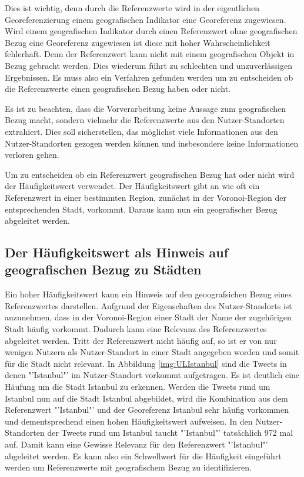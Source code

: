 		Dies ist wichtig, denn durch die Referenzwerte wird in der eigentlichen Georeferenzierung einem geografischen Indikator eine Georeferenz zugewiesen. 
		Wird einem geografischen Indikator durch einen Referenzwert ohne geografischen Bezug eine Georeferenz zugewiesen ist diese mit hoher Wahrscheinlichkeit fehlerhaft.
		Denn der Referenzwert kann nicht mit einem geografischen Objekt in Bezug gebracht werden.
		Dies wiederum führt zu schlechten und unzuverlässigen Ergebnissen.
		Es muss also ein Verfahren gefunden werden um zu entscheiden ob die Referenzwerte einen geografischen Bezug haben oder nicht.

		Es ist zu beachten, dass die Vorverarbeitung keine Aussage zum geografischen Bezug macht, sondern vielmehr die Referenzwerte aus den Nutzer-Standorten extrahiert. 
		Dies soll sicherstellen, das möglichst viele Informationen aus den Nutzer-Standorten gezogen werden können und insbesondere keine Informationen verloren gehen.  
		
		Um zu entscheiden ob ein Referenzwert geografischen Bezug hat oder nicht wird der Häufigkeitswert verwendet.
		Der Häufigkeitswert gibt an wie oft ein Referenzwert in einer bestimmten Region, zunächst in der Voronoi-Region der entsprechenden Stadt, vorkommt.			 
		Daraus kann nun ein geografischer Bezug abgeleitet werden.

		\subsection{Der Häufigkeitswert als Hinweis auf geografischen Bezug zu Städten} 
			
			Ein hoher Häufigkeitswert kann ein Hinweis auf den geoografsichen Bezug eines Referenzwertes darstellen. 
			Aufgrund der Eigenschaften des Nutzer-Standorts ist anzunehmen, dass in der Voronoi-Region einer Stadt der Name der zugehörigen Stadt häufig vorkommt.
			Dadurch kann eine Relevanz des Referenzwertes abgeleitet werden. 
			Tritt der Referenzwert nicht häufig auf, so ist er von nur wenigen Nutzern als Nutzer-Standort in einer Stadt angegeben worden und somit für die Stadt nicht relevant.
			In Abbildung \ref{img:ULIstanbul} sind die Tweets in denen "'Istanbul"' im Nutzer-Standort vorkommt aufgetragen.
			Es ist deutlich eine Häufung um die Stadt Istanbul zu erkennen. 
			Werden die Tweets rund um Istanbul nun auf die Stadt Istanbul abgebildet, wird die Kombination aus dem Referenzwert "'Istanbul"' und der Georeferenz Istanbul sehr häufig vorkommen und dementsprechend einen hohen Häufigkeitswert aufweisen.
			In den Nutzer-Standorten der Tweets rund um Istanbul taucht "'Istanbul"' tatsächlich 972 mal auf.
			Damit kann eine Gewisse Relevanz für den Referenzwert "'Istanbul"' abgeleitet werden.
			Es kann also ein Schwellwert für die Häufigkeit eingeführt werden um Referenzwerte mit geografischem Bezug zu identifizieren.

